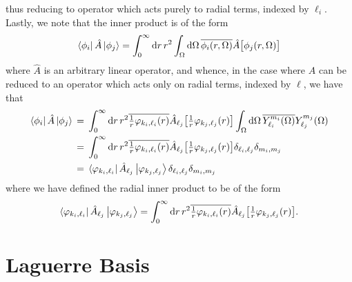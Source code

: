 \documentclass[]{article}
\begin{document}
thus reducing to operator which acts purely to radial terms, indexed by
$\ell_{i}$.
Lastly, we note that the inner product is of the form
\begin{equation*}
  \bra{\phi_{i}}
  \hat{A}
  \ket{\phi_{j}}
  =
  \int_{0}^{\infty}
  \dd{r}
  {
    r^{2}
    \int_{\Omega}
    \dd{\Omega}
    {
      \overline
      {
        \phi_{i}\lr{r, \Omega}
      }
      \hat{A}
      \lrsq[\big]
      {
        \phi_{j}\lr{r, \Omega}
      }
    }
  }
\end{equation*}
where $\hat{A}$ is an arbitrary linear operator, and whence, in the case where
$\hat{A}$ can be reduced to an operator which acts only on radial terms, indexed
by $\ell$, we have that
\begin{alignat*}{2}
  \bra{\phi_{i}}
  \hat{A}
  \ket{\phi_{j}}
  {}={}
  &
  \int_{0}^{\infty}
  \dd{r}
  {
    r^{2}
    \overline
    {
      \tfrac{1}{r}
      \varphi_{k_{i}, \ell_{i}}\lr{r}
    }
    \hat{A}_{\ell_{j}}
    \lrsq[\big]
    {
      \tfrac{1}{r}
      \varphi_{k_{j}, \ell_{j}}\lr{r}
    }
  }
  \int_{\Omega}
  \dd{\Omega}
  {
    \overline
    {
      Y_{\ell_{i}}^{m_{i}}\lr{\Omega}
    }
    Y_{\ell_{j}}^{m_{j}}\lr{\Omega}
  }
  \\
  {}={}
  &
  \int_{0}^{\infty}
  \dd{r}
  {
    r^{2}
    \overline
    {
      \tfrac{1}{r}
      \varphi_{k_{i}, \ell_{i}}\lr{r}
    }
    \hat{A}_{\ell_{j}}
    \lrsq[\big]
    {
      \tfrac{1}{r}
      \varphi_{k_{j}, \ell_{j}}\lr{r}
    }
  }
  \delta_{\ell_{i}, \ell_{j}}
  \delta_{m_{i}, m_{j}}
  \\
  {}={}
  &
  \bra{\varphi_{k_{i}, \ell_{i}}}
  \hat{A}_{\ell_{j}}
  \ket{\varphi_{k_{j}, \ell_{j}}}
  \delta_{\ell_{i}, \ell_{j}}
  \delta_{m_{i}, m_{j}}
\end{alignat*}
where we have defined the radial inner product to be of the form
\begin{equation*}
  \bra{\varphi_{k_{i}, \ell_{i}}}
  \hat{A}_{\ell_{j}}
  \ket{\varphi_{k_{j}, \ell_{j}}}
  =
  \int_{0}^{\infty}
  \dd{r}
  {
    r^{2}
    \overline
    {
      \tfrac{1}{r}
      \varphi_{k_{i}, \ell_{i}}\lr{r}
    }
    \hat{A}_{\ell_{j}}
    \lrsq[\big]
    {
      \tfrac{1}{r}
      \varphi_{k_{j}, \ell_{j}}\lr{r}
    }
  }
  .
\end{equation*}

\section{Laguerre Basis}
\label{sec:laguerre-basis}
\end{document}
